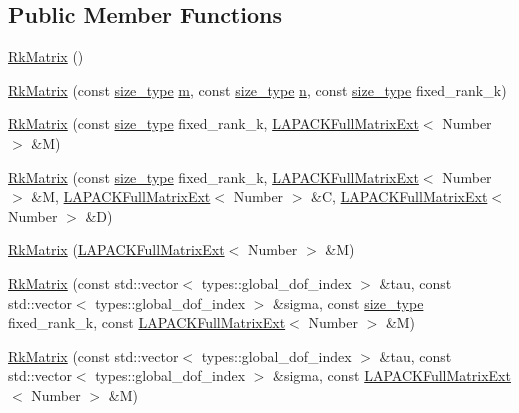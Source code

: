 \subsection*{Public Member Functions}
\begin{DoxyCompactItemize}
\item 
\hyperlink{classRkMatrix_aa2753ce8e37595824ac275e6b26255cf}{Rk\+Matrix} ()
\item 
\hyperlink{classRkMatrix_a2ed616a9c4e1b12688a903b427260241}{Rk\+Matrix} (const \hyperlink{classRkMatrix_add060bfc3a4cc77f858c3d6dd58cadd5}{size\+\_\+type} \hyperlink{classRkMatrix_a8ca8898bcfedeee135437833f83b144c}{m}, const \hyperlink{classRkMatrix_add060bfc3a4cc77f858c3d6dd58cadd5}{size\+\_\+type} \hyperlink{classRkMatrix_a06d3b6636bb423c391c66e4ccc722687}{n}, const \hyperlink{classRkMatrix_add060bfc3a4cc77f858c3d6dd58cadd5}{size\+\_\+type} fixed\+\_\+rank\+\_\+k)
\item 
\hyperlink{classRkMatrix_a6078a6d21d37f140ff8774b8310a19eb}{Rk\+Matrix} (const \hyperlink{classRkMatrix_add060bfc3a4cc77f858c3d6dd58cadd5}{size\+\_\+type} fixed\+\_\+rank\+\_\+k, \hyperlink{classLAPACKFullMatrixExt}{L\+A\+P\+A\+C\+K\+Full\+Matrix\+Ext}$<$ Number $>$ \&M)
\item 
\hyperlink{classRkMatrix_afd9d75ce0a42585337d4c630d5e08140}{Rk\+Matrix} (const \hyperlink{classRkMatrix_add060bfc3a4cc77f858c3d6dd58cadd5}{size\+\_\+type} fixed\+\_\+rank\+\_\+k, \hyperlink{classLAPACKFullMatrixExt}{L\+A\+P\+A\+C\+K\+Full\+Matrix\+Ext}$<$ Number $>$ \&M, \hyperlink{classLAPACKFullMatrixExt}{L\+A\+P\+A\+C\+K\+Full\+Matrix\+Ext}$<$ Number $>$ \&C, \hyperlink{classLAPACKFullMatrixExt}{L\+A\+P\+A\+C\+K\+Full\+Matrix\+Ext}$<$ Number $>$ \&D)
\item 
\hyperlink{classRkMatrix_a08ab45361d9e3cca139727dca31f9bfa}{Rk\+Matrix} (\hyperlink{classLAPACKFullMatrixExt}{L\+A\+P\+A\+C\+K\+Full\+Matrix\+Ext}$<$ Number $>$ \&M)
\item 
\hyperlink{classRkMatrix_acdd046caab506cd04e09b65bb3ffc1f9}{Rk\+Matrix} (const std\+::vector$<$ types\+::global\+\_\+dof\+\_\+index $>$ \&tau, const std\+::vector$<$ types\+::global\+\_\+dof\+\_\+index $>$ \&sigma, const \hyperlink{classRkMatrix_add060bfc3a4cc77f858c3d6dd58cadd5}{size\+\_\+type} fixed\+\_\+rank\+\_\+k, const \hyperlink{classLAPACKFullMatrixExt}{L\+A\+P\+A\+C\+K\+Full\+Matrix\+Ext}$<$ Number $>$ \&M)
\item 
\hyperlink{classRkMatrix_a4cfccf769e03141b5221c1356bd718a1}{Rk\+Matrix} (const std\+::vector$<$ types\+::global\+\_\+dof\+\_\+index $>$ \&tau, const std\+::vector$<$ types\+::global\+\_\+dof\+\_\+index $>$ \&sigma, const \hyperlink{classLAPACKFullMatrixExt}{L\+A\+P\+A\+C\+K\+Full\+Matrix\+Ext}$<$ Number $>$ \&M)

\end{DoxyCompactItemize}
